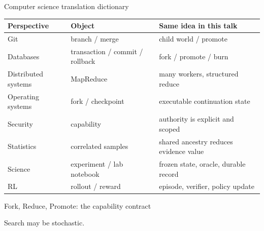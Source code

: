 \begin{frame}{Computer science translation dictionary}
\small
\begin{tabular}{p{}p{}p{}}
\toprule
\textbf{Perspective} & \textbf{Object} & \textbf{Same idea in this talk} \\
\midrule
Git & branch / merge & child world / promote \\
Databases & transaction / commit / rollback & fork / promote / burn \\
Distributed systems & MapReduce & many workers, structured reduce \\
Operating systems & fork / checkpoint & executable continuation state \\
Security & capability & authority is explicit and scoped \\
Statistics & correlated samples & shared ancestry reduces evidence value \\
Science & experiment / lab notebook & frozen state, oracle, durable record \\
RL & rollout / reward & episode, verifier, policy update \\
\bottomrule
\end{tabular}
\end{frame}

\begin{frame}{Fork, Reduce, Promote: the capability contract}
\centering
{}
\vspace{1em}
\begin{center}
\large \law
\end{center}
\vspace{0.45em}
\Large Search may be stochastic. 
\end{frame}

